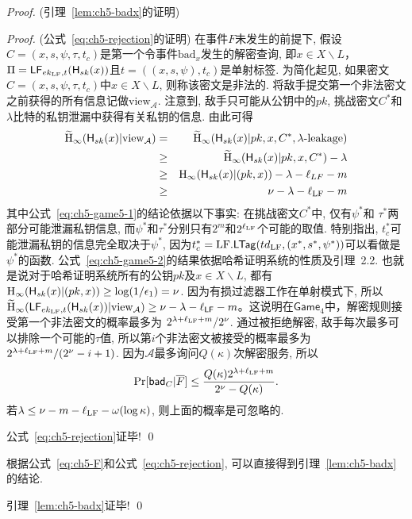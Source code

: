 \begin{proof}{(引理~\ref{lem:ch5-badx}的证明)}
\begin{proof}{(公式~\eqref{eq:ch5-rejection}的证明)}
在事件$F$未发生的前提下, 假设$C = (x, s, \psi, \tau, t_c)$是第一个令事件$\text{bad}_x$发生的解密查询, 即$x \in X \backslash L$，$\Pi = \mathsf{LF}_{ek_{\text{LF}}, t}(\mathsf{H}_{sk}(x))$且$t = ((x, s,\psi), t_c)$是单射标签. 为简化起见, 如果密文$C=(x, s, \psi, \tau, t_c)$中$x \in X \backslash L$, 则称该密文是非法的. 将敌手提交第一个非法密文之前获得的所有信息记做$\text{view}_{\mathcal{A}}$. 注意到, 敌手只可能从公钥中的$pk$, 挑战密文$C^*$和$\lambda$比特的私钥泄漏中获得有关私钥的信息. 由此可得
\begin{eqnarray}\nonumber
\widetilde{\textup{H}}_{\infty}(\mathsf{H}_{sk}(x) | \text{view}_{\mathcal{A}}) & = & \widetilde{\textup{H}}_{\infty}(\mathsf{H}_{sk}(x) | pk, x, C^*, \lambda\textup{-leakage}) \nonumber\\
  &\geq &  \widetilde{\textup{H}}_{\infty}(\mathsf{H}_{sk}(x) | pk, x, C^*) - \lambda \nonumber\\
  &\geq & \textup{H}_{\infty}(\mathsf{H}_{sk}(x) |(pk, x)) - \lambda - \ell_{LF} - m \label{eq:ch5-game5-1}\\
  &\geq & \nu - \lambda - \ell_{\text{LF}} - m  \label{eq:ch5-game5-2}
\end{eqnarray}
其中公式~\eqref{eq:ch5-game5-1}的结论依据以下事实: 在挑战密文$C^*$中, 仅有$\psi^*$和 $\tau^*$两部分可能泄漏私钥信息, 而$\psi^*$和$\tau^*$分别只有$2^m$和$2^{\ell_{\text{LF}}}$个可能的取值. 特别指出, $t_c^*$可能泄漏私钥的信息完全取决于$\psi^*$, 因为$t_c^* = \text{LF}.\mathsf{LTag}(td_{\text{LF}}, (x^*, s^*, \psi^*))$可以看做是$\psi^*$的函数. 公式~\eqref{eq:ch5-game5-2}的结果依据哈希证明系统的性质及引理~2.2. 也就是说对于哈希证明系统所有的公钥$pk$及$x \in X \backslash L$, 都有$\textup{H}_{\infty}(\mathsf{H}_{sk}(x) |(pk, x))\geq \log(1/\epsilon_1) = \nu$. 因为有损过滤器工作在单射模式下, 所以 $\widetilde{\textup{H}}_{\infty}(\mathsf{LF}_{ek_{\text{LF}}, t}(\mathsf{H}_{sk}(x)) | \text{view}_{\mathcal{A}}) \geq \nu-\lambda-\ell_{\mathsf{LF}}-m$。这说明在$\mathsf{Game}_4$中，解密规则接受第一个非法密文的概率最多为 $2^{\lambda+\ell_{\text{LF}} + m} / 2^\nu$. 通过被拒绝解密, 敌手每次最多可以排除一个可能的$\tau$值, 所以第$i$个非法密文被接受的概率最多为$2^{\lambda+\ell_{\text{LF}}+m} / (2^\nu-i+1)$. 因为$\mathcal{A}$最多询问$Q(\kappa)$次解密服务, 所以
\begin{equation}
\textup{Pr}[\mathsf{bad}_C | \overline{F}] \leq \dfrac{Q(\kappa)2^{\lambda+\ell_{\text{LF}} + m}}{2^\nu - Q(\kappa)}.
\end{equation}
若$\lambda\leq \nu - m - \ell_{\text{LF}} - \omega(\log\kappa)$, 则上面的概率是可忽略的. 

公式~\eqref{eq:ch5-rejection}证毕! \qed
\end{proof}

根据公式~\eqref{eq:ch5-F}和公式~\eqref{eq:ch5-rejection}, 可以直接得到引理~\ref{lem:ch5-badx}的结论. 

引理~\ref{lem:ch5-badx}证毕! \qed
\end{proof}

